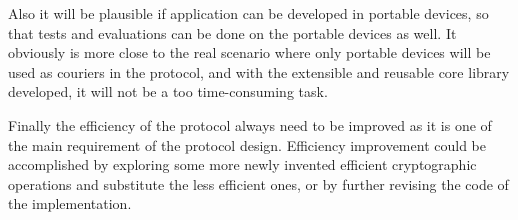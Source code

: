 Also it will be plausible if application can be developed in portable devices, so that tests and evaluations can be done on the portable devices as well. It obviously is more close to the real scenario where only portable devices will be used as couriers in the protocol, and with the extensible and reusable core library developed, it will not be a too time-consuming task.

Finally the efficiency of the protocol always need to be improved as it is one of the main requirement of the protocol design. Efficiency improvement could be accomplished by exploring some more newly invented efficient cryptographic operations and substitute the less efficient ones, or by further revising the code of the implementation.